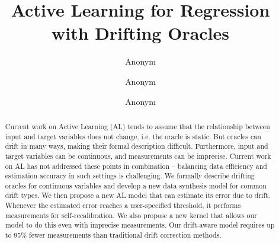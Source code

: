 \documentclass[runningheads]{llncs}
\begin{document}
%
\title{Active Learning for Regression with Drifting Oracles}
%
%
\author{Anonym  \and
Anonym  \and
Anonym }
%
%
%
\maketitle              %
%
\begin{abstract}
Current work on Active Learning (AL) tends to assume that the relationship between input and target variables does not change, i.e. the oracle is static.
But oracles can drift in many ways, making their formal description difficult.
Furthermore, input and target variables can be continuous, and measurements can be imprecise.
Current work on AL has not addressed these points in combination -- balancing data efficiency and estimation accuracy in such settings is challenging.
We formally describe drifting oracles for continuous variables and develop a new data synthesis model for common drift types.
We then propose a new AL model that can estimate its error due to drift.
Whenever the estimated error reaches a user-specified threshold, it performs measurements for self-recalibration.
We also propose a new kernel that allows our model to do this even with imprecise measurements.
Our drift-aware model requires up to 95\% fewer measurements than traditional drift correction methods.

\end{abstract}
\end{document}
